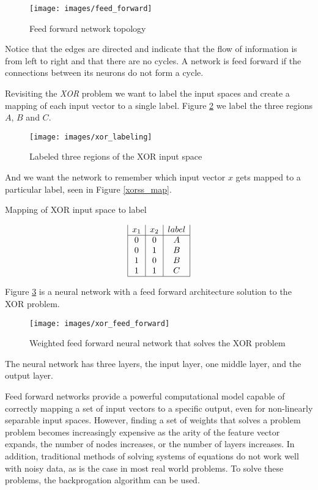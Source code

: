 \begin{figure}[h!]
  \centering
  \texttt{[image: images/feed\_forward]}
  \caption{Feed forward network topology}
  \label{ff}
\end{figure}

Notice that the edges are directed and indicate that the flow of information is from left to right and that there are no cycles.
A network is feed forward if the connections between its neurons do not form a cycle.

Revisiting the {\it XOR} problem we want to label the input spaces
and create a mapping of each input vector to a single label.
Figure \ref{xor_label} we label the three regions $A$, $B$ and $C$.

\begin{figure}[h!]
  \centering
  \texttt{[image: images/xor\_labeling]}
  \caption{Labeled three regions of the XOR input space}
  \label{xor_label}
\end{figure}

And we want the network to remember which input vector $x$ gets mapped to a
particular label, seen in Figure \ref{xorss_map}.

\begin{table}[h!]
\caption{Mapping of XOR input space to label}
\label{xorss_map}
\begin{displaymath}
\begin{array}{|c|c|c|}
   x_1
 & x_2
 & label
\\
\hline
0 & 0 & A\\
0 & 1 & B\\
1 & 0 & B\\
1 & 1 & C\\
\hline
\end{array}
\end{displaymath}
\end{table}

Figure \ref{xff} is a neural network with a feed forward architecture
solution to the XOR problem.

\begin{figure}[h!]
  \centering
  \texttt{[image: images/xor\_feed\_forward]}
  \caption{Weighted feed forward neural network that solves the XOR
    problem}
  \label{xff}
\end{figure}

The neural network has three layers, the input layer, one middle
layer, and the output layer.

Feed forward networks provide a powerful computational model capable
of correctly mapping a set of input vectors to a specific output, even
for non-linearly separable input spaces.
However, finding a set of weights that solves a problem
problem becomes increasingly expensive as the arity of the feature
vector expands, the number of nodes increases, or the number of layers
increases.
In addition, traditional methods of solving systems of equations do not work
well with noisy data, as is the case in most real world problems.
To solve these problems, the backprogation algorithm can be used.

